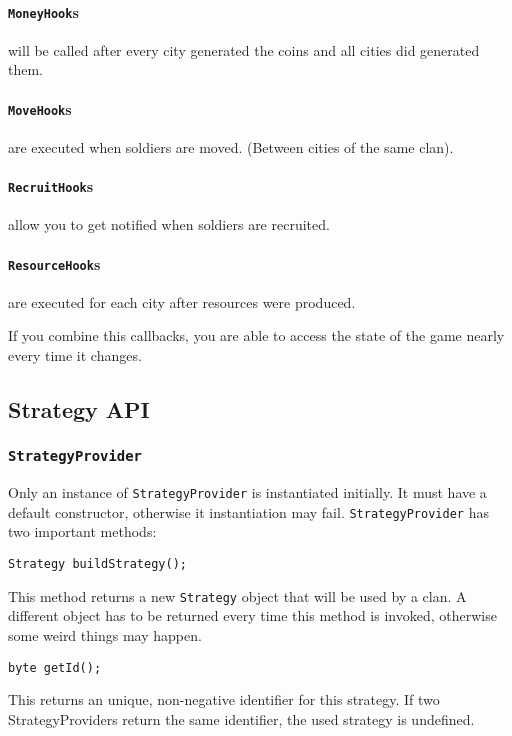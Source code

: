 \documentclass{article}
\begin{document}
\paragraph{\texttt{MoneyHook}s} will be called after every city generated the coins and all cities did generated them.
\paragraph{\texttt{MoveHook}s} are executed when soldiers are moved. (Between cities of the same clan).  
\paragraph{\texttt{RecruitHook}s} allow you to get notified when soldiers are recruited.
\paragraph{\texttt{ResourceHook}s} are executed for each city after resources were produced.\newline

If you combine this callbacks, you are able to access the state of the game nearly every time it changes.
\subsection{Strategy API}
\subsubsection{\texttt{StrategyProvider}}
Only an instance of \texttt{StrategyProvider} is instantiated initially. It must have a default constructor, otherwise it instantiation may fail. \texttt{StrategyProvider} has two important methods:
\begin{verbatim}
Strategy buildStrategy();
\end{verbatim}
This method returns a new \texttt{Strategy} object that will be used by a clan. A different object has to be returned every time this method is invoked, otherwise some weird things may happen.
\begin{verbatim}
byte getId();
\end{verbatim}
This returns an unique, non-negative identifier for this strategy. If two StrategyProviders return the same identifier, the used strategy is undefined.
\end{document}
